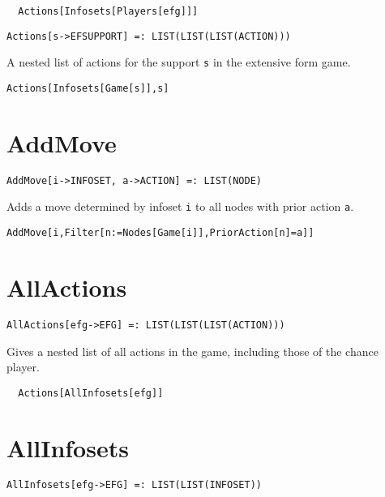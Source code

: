 \udfbody
\begin{verbatim}
  Actions[Infosets[Players[efg]]]
\end{verbatim} 

\latexignore{\hrule}
\begin{verbatim}
Actions[s->EFSUPPORT] =: LIST(LIST(LIST(ACTION))) 
\end{verbatim}

A nested list of actions for the support \verb+s+ in the extensive
form game.

\udfbody
\begin{verbatim}
Actions[Infosets[Game[s]],s]
\end{verbatim} 


\section*{AddMove}\label{ExtAddMove}
\begin{verbatim}
AddMove[i->INFOSET, a->ACTION] =: LIST(NODE) 
\end{verbatim}

Adds a move determined by infoset \verb+i+ to all nodes with prior
action \verb+a+.  

\udfbody
\begin{verbatim}
AddMove[i,Filter[n:=Nodes[Game[i]],PriorAction[n]=a]]
\end{verbatim} 


\section*{AllActions}\label{ExtAllActions}
\begin{verbatim}
AllActions[efg->EFG] =: LIST(LIST(LIST(ACTION))) 
\end{verbatim}

Gives a nested list of all actions in the game, including those of
the chance player.  

\udfbody
\begin{verbatim}
  Actions[AllInfosets[efg]]
\end{verbatim} 


\section*{AllInfosets}\label{ExtAllInfosets}
\begin{verbatim}
AllInfosets[efg->EFG] =: LIST(LIST(INFOSET)) 
\end{verbatim}


